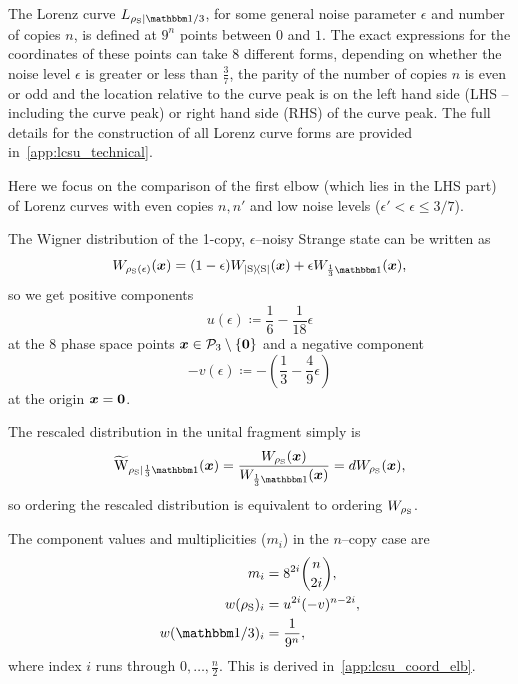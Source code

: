 \documentclass[pra,
aps,
twocolumn,
superscriptaddress,
groupedaddress,
nofootinbib,
reprint
]{revtex4-1}
\begin{document}
The Lorenz curve $\lc{\rho_{\rm{S}}}{\id/3}$, for some general noise parameter $\epsilon$ and number of copies $n$, is defined at $9^n$ points between $0$ and $1$.
The exact expressions for the coordinates of these points can take $8$ different forms, depending on whether the noise level $\epsilon$ is greater or less than $\frac{3}{7}$, the parity of the number of copies $n$ is even or odd and the location relative to the curve peak is on the left hand side (LHS -- including the curve peak) or right hand side (RHS) of the curve peak.
The full details for the construction of all Lorenz curve forms are provided in~\cref{app:lcsu_technical}.

Here we focus on the comparison of the first elbow (which lies in the LHS part) of Lorenz curves with even copies $n, n'$ and low noise levels ($\epsilon' < \epsilon \leq 3/7$).

The Wigner distribution of the 1-copy, $\epsilon$--noisy Strange state can be written as 
\begin{equation}
	\W[\bmx]{\rho_{\rm{S}}(\epsilon)} = (1-\epsilon)\W[\bmx]{\ketbra{\rm{S}}} + \epsilon\W[\bmx]{\frac{1}{3}\id},
\end{equation}
so we get positive components
\begin{equation}
	u(\epsilon) \coloneqq \frac{1}{6} -\frac{1}{18}\epsilon
\end{equation}
at the 8 phase space points $\bm{x} \in \mathcal{P}_3 \setminus \{\bm{0}\}$ and a negative component
\begin{equation}
	- v(\epsilon) \coloneqq - \left( \frac{1}{3} -\frac{4}{9}\epsilon \right)
\end{equation}
at the origin $\bm{x} = \bm{0}$.

The rescaled distribution in the unital fragment simply is 
\begin{equation}
	\widetilde{\rm{W}}_{\rho_{\rm{S}}|\frac{1}{3}\id}(\bmx) = \frac{\W[\bmx]{\rho_{\rm{S}}}}{\W[\bmx]{\frac{1}{3}\id}} = d\W[\bmx]{\rho_{\rm{S}}},
\end{equation}
so ordering the rescaled distribution is equivalent to ordering $\W{\rho_{\rm{S}}}$.

The component values and multiplicities ($m_i$) in the $n$--copy case are 
\begin{align}
	m_i &= 8^{2i}\binom{n}{2i}, \\
	w(\rho_{\rm{S}})_i &= u^{2i}(-v)^{n-2i}, \\
	w(\id/3)_i &=  \frac{1}{9^n},
\end{align}
where index $i$ runs through $0,\dots,\frac{n}{2}$.
This is derived in~\cref{app:lcsu_coord_elb}.
\end{document}
